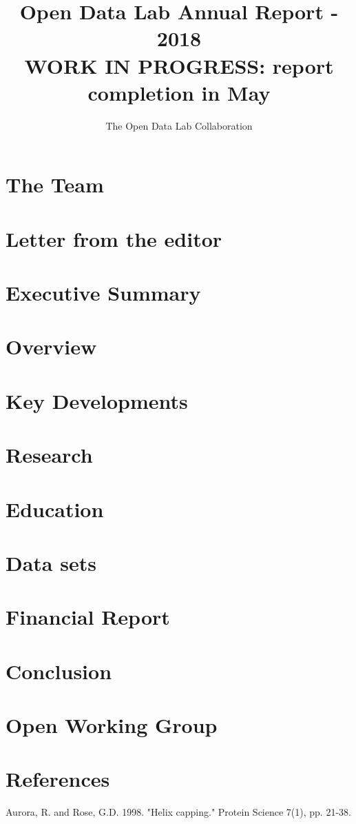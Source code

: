 \documentclass[12pt,letterpaper]{report} %
\title{Open Data Lab Annual Report - 2018\\
\large WORK IN PROGRESS: report completion in May }
\author{The Open Data Lab Collaboration}
\begin{document}
\maketitle
\chapter*{The Team}   %
\chapter*{Letter from the editor}   %
\chapter{Executive Summary}
\tableofcontents
\chapter{Overview} 
\chapter{Key Developments} 
\chapter{Research} 
\chapter{Education} 
\chapter{Data sets} 	
\chapter{Financial Report} 
\chapter{Conclusion}

\appendix
\chapter{Open Working Group}
 

\chapter{References}
\begin{thebibliography}{99}
 Aurora, R. and Rose, G.D. 1998. "Helix capping." Protein Science 7(1), pp. 21-38.
\end{thebibliography}
\end{document}
